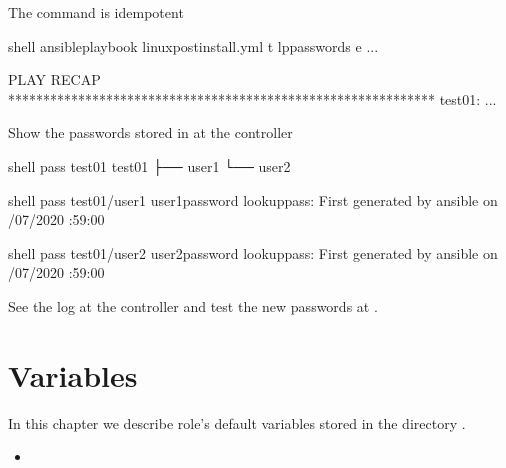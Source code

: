 \documentclass[letterpaper,10pt,english]{sphinxmanual}
\begin{document}
The command is idempotent

%
\begin{sphinxVerbatim}[commandchars=\\\{\}]
shell\PYGZgt{} ansible\PYGZhy{}playbook linux\PYGZhy{}postinstall.yml \PYGZhy{}t lp\PYGZus{}passwords 
                                    \PYGZhy{}e 
...

PLAY RECAP *************************************************************
test\PYGZus{}01:       ...
\end{sphinxVerbatim}
\sphinxresetverbatimhllines

Show the passwords stored in  at the controller

%
\begin{sphinxVerbatim}[commandchars=\\\{\}]
shell\PYGZgt{} pass test\PYGZus{}01
test\PYGZus{}01
├── user1
└── user2

shell\PYGZgt{} pass test\PYGZus{}01/user1
user1\PYGZus{}password
lookup\PYGZus{}pass: First generated by ansible on /07/2020 :59:00

shell\PYGZgt{} pass test\PYGZus{}01/user2
user2\PYGZus{}password
lookup\PYGZus{}pass: First generated by ansible on /07/2020 :59:00
\end{sphinxVerbatim}
\sphinxresetverbatimhllines

See the  log at the controller  and test the
new passwords at .


\section{Variables}
\label{\detokenize{guide:variables}}\label{\detokenize{guide:ug-vars}}
In this chapter we describe role’s default variables stored in the
directory .



\begin{itemize}
\item {} 

\end{itemize}
\end{document}
